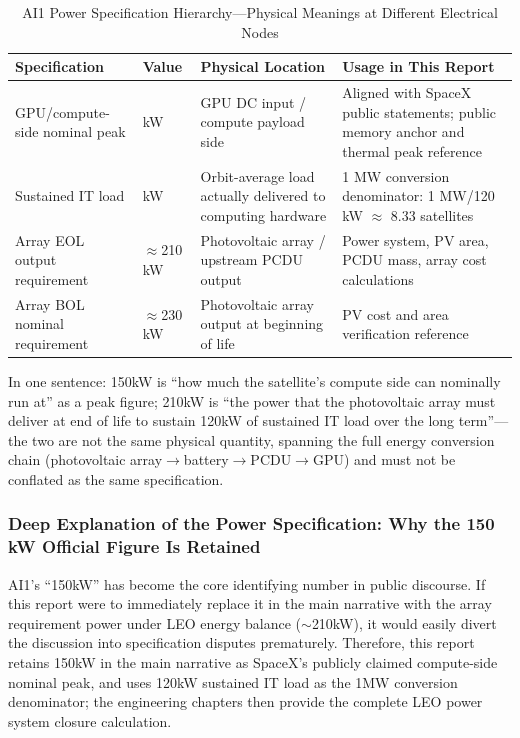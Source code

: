 \begin{table}[H]
\centering
\caption{AI1 Power Specification Hierarchy---Physical Meanings at Different Electrical Nodes}
\label{tab:power_layers}
\footnotesize
\begin{tabular}{p{3.8cm}>{\centering\arraybackslash}p{2.0cm}p{3.0cm}p{4.0cm}}
\toprule
\textbf{Specification} & \textbf{Value} & \textbf{Physical Location} & \textbf{Usage in This Report} \\
\midrule
GPU/compute-side nominal peak & 150 kW & GPU DC input / compute payload side & Aligned with SpaceX public statements; public memory anchor and thermal peak reference \\
Sustained IT load & 120 kW & Orbit-average load actually delivered to computing hardware & 1 MW conversion denominator: 1 MW/120 kW $\approx$ 8.33 satellites \\
Array EOL output requirement & $\approx$210 kW & Photovoltaic array / upstream PCDU output & Power system, PV area, PCDU mass, array cost calculations \\
Array BOL nominal requirement & $\approx$230 kW & Photovoltaic array output at beginning of life & PV cost and area verification reference \\
\bottomrule
\end{tabular}
\end{table}

In one sentence: 150\;kW is ``how much the satellite's compute side can nominally run at'' as a peak figure; 210\;kW is ``the power that the photovoltaic array must deliver at end of life to sustain 120\;kW of sustained IT load over the long term''---the two are not the same physical quantity, spanning the full energy conversion chain (photovoltaic array$\to$battery$\to$PCDU$\to$GPU) and must not be conflated as the same specification.

\subsubsection{Deep Explanation of the Power Specification: Why the 150 kW Official Figure Is Retained}

AI1's ``150\;kW'' has become the core identifying number in public discourse. If this report were to immediately replace it in the main narrative with the array requirement power under LEO energy balance ($\sim$210\;kW), it would easily divert the discussion into specification disputes prematurely. Therefore, this report retains 150\;kW in the main narrative as SpaceX's publicly claimed compute-side nominal peak, and uses 120\;kW sustained IT load as the 1\;MW conversion denominator; the engineering chapters then provide the complete LEO power system closure calculation.

